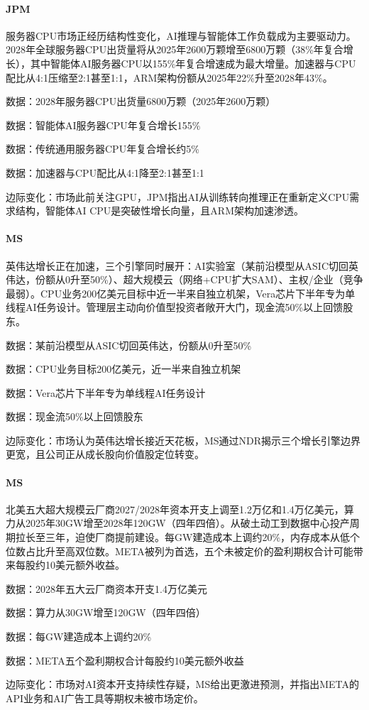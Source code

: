 \documentclass[11pt]{ctexart}
\begin{document}
\paragraph{JPM} 服务器CPU市场正经历结构性变化，AI推理与智能体工作负载成为主要驱动力。2028年全球服务器CPU出货量将从2025年2600万颗增至6800万颗（38\%年复合增长），其中智能体AI服务器CPU以155\%年复合增速成为最大增量。加速器与CPU配比从4:1压缩至2:1甚至1:1，ARM架构份额从2025年22\%升至2028年43\%。
{\small\color{refgray}数据：2028年服务器CPU出货量6800万颗（2025年2600万颗）\par}
{\small\color{refgray}数据：智能体AI服务器CPU年复合增长155\%\par}
{\small\color{refgray}数据：传统通用服务器CPU年复合增长约5\%\par}
{\small\color{refgray}数据：加速器与CPU配比从4:1降至2:1甚至1:1\par}
{\small\color{refgray}边际变化：市场此前关注GPU，JPM指出AI从训练转向推理正在重新定义CPU需求结构，智能体AI CPU是突破性增长向量，且ARM架构加速渗透。\par}
\paragraph{MS} 英伟达增长正在加速，三个引擎同时展开：AI实验室（某前沿模型从ASIC切回英伟达，份额从0升至50\%）、超大规模云（网络+CPU扩大SAM）、主权/企业（竞争最弱）。CPU业务200亿美元目标中近一半来自独立机架，Vera芯片下半年专为单线程AI任务设计。管理层主动向价值型投资者敞开大门，现金流50\%以上回馈股东。
{\small\color{refgray}数据：某前沿模型从ASIC切回英伟达，份额从0升至50\%\par}
{\small\color{refgray}数据：CPU业务目标200亿美元，近一半来自独立机架\par}
{\small\color{refgray}数据：Vera芯片下半年专为单线程AI任务设计\par}
{\small\color{refgray}数据：现金流50\%以上回馈股东\par}
{\small\color{refgray}边际变化：市场认为英伟达增长接近天花板，MS通过NDR揭示三个增长引擎边界更宽，且公司正从成长股向价值股定位转变。\par}
\paragraph{MS} 北美五大超大规模云厂商2027/2028年资本开支上调至1.2万亿和1.4万亿美元，算力从2025年30GW增至2028年120GW（四年四倍）。从破土动工到数据中心投产周期拉长至三年，迫使厂商提前建设。每GW建造成本上调约20\%，内存成本从低个位数占比升至高双位数。META被列为首选，五个未被定价的盈利期权合计可能带来每股约10美元额外收益。
{\small\color{refgray}数据：2028年五大云厂商资本开支1.4万亿美元\par}
{\small\color{refgray}数据：算力从30GW增至120GW（四年四倍）\par}
{\small\color{refgray}数据：每GW建造成本上调约20\%\par}
{\small\color{refgray}数据：META五个盈利期权合计每股约10美元额外收益\par}
{\small\color{refgray}边际变化：市场对AI资本开支持续性存疑，MS给出更激进预测，并指出META的API业务和AI广告工具等期权未被市场定价。\par}
\end{document}
